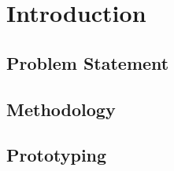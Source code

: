 \chapter{Introduction}\label{ch:introduction}


\section{Problem Statement}


\section{Methodology}


\section{Prototyping}


